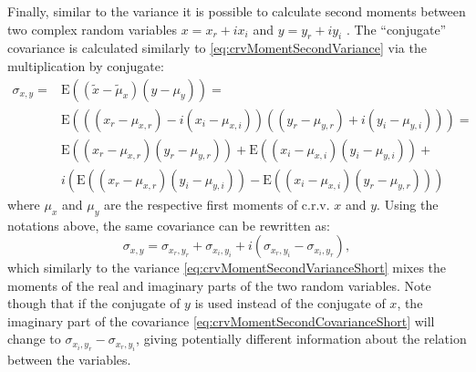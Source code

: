 \documentclass[
]{book}
\begin{document}
Finally, similar to the variance it is possible to calculate second moments between two complex random variables \(x = x_r+i x_i\) and \(y = y_r + i y_i\) \citep{Picinbono}. The ``conjugate'' covariance is calculated similarly to \eqref{eq:crvMomentSecondVariance} via the multiplication by conjugate:
\begin{equation}
    \begin{aligned}
    \sigma_{x,y} = & \mathrm{E}((\tilde{x}-\tilde{\mu}_x) (y-\mu_y)) = \\
                   & \mathrm{E}\left(((x_r-\mu_{x,r}) - i (x_i-\mu_{x,i}))((y_r-\mu_{y,r}) + i (y_i-\mu_{y,i}))\right) = \\
                   & \mathrm{E}((x_r-\mu_{x,r})(y_r-\mu_{y,r})) + \mathrm{E}((x_i-\mu_{x,i})(y_i-\mu_{y,i})) + \\
                   & i \left(\mathrm{E}((x_r-\mu_{x,r})(y_i-\mu_{y,i})) - \mathrm{E}((x_i-\mu_{x,i})(y_r-\mu_{y,r}))\right)
    \end{aligned}
    \label{eq:crvMomentSecondCovariance}
\end{equation}
where \(\mu_{x}\) and \(\mu_y\) are the respective first moments of c.r.v. \(x\) and \(y\). Using the notations above, the same covariance can be rewritten as:
\begin{equation}
    \sigma_{x,y} = \sigma_{x_r, y_r} + \sigma_{x_i, y_i} + i (\sigma_{x_r, y_i} - \sigma_{x_i, y_r}),
    \label{eq:crvMomentSecondCovarianceShort}
\end{equation}
which similarly to the variance \eqref{eq:crvMomentSecondVarianceShort} mixes the moments of the real and imaginary parts of the two random variables. Note though that if the conjugate of \(y\) is used instead of the conjugate of \(x\), the imaginary part of the covariance \eqref{eq:crvMomentSecondCovarianceShort} will change to \(\sigma_{x_i, y_r} - \sigma_{x_r, y_i}\), giving potentially different information about the relation between the variables.
\end{document}
